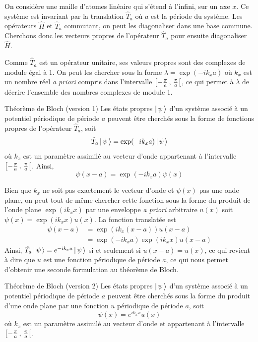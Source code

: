     On considère une maille d’atomes linéaire qui s’étend à l’infini, sur un axe $x$. Ce système est invariant par la translation $\hat{T}_{a}$ où $a$ est la période du système. Les opérateurs $\hat{H}$ et $\hat{T}_a$ commutant, on peut les diagonaliser dans une base commune. Cherchons donc les vecteurs propres de l’opérateur $\hat{T}_a$ pour ensuite diagonaliser $\hat{H}$. 

    Comme $\hat{T}_a$ est un opérateur unitaire, ses valeurs propres sont des complexes de module égal à 1. On peut les chercher sous la forme $\lambda = \exp(-ik_xa)$ où $k_x$ est un nombre réel \textit{a priori} compris dans l’intervalle $\left[ -\frac{\pi}{a} \, , \, \frac{\pi}{a} \right[$, ce qui permet à $\lambda$ de décrire l’ensemble des nombres complexes de module 1.

    \begin{omed}{Théorème de Bloch (version 1)}
        Les états propres $\left| \, \psi \, \right>$ d’un système associé à un potentiel périodique de période $a$ peuvent être cherchés sous la forme de fonctions propres de l’opérateur $\hat{T}_a$, soit 
        \[ \hat{T}_a \left| \, \psi \, \right> = \exp(-i k_x a) \left| \, \psi \, \right> \] 
        où $k_x$ est un paramètre assimilé au vecteur d’onde appartenant à l’intervalle $\left[ -\frac{\pi}{a} \, , \, \frac{\pi}{a} \right[$. Ainsi, 
        \[ \psi(x - a) = \exp(-i k_x a) \psi(x) \]   
    \end{omed}

    Bien que $k_x$ ne soit pas exactement le vecteur d’onde et $\psi(x)$ pas une onde plane, on peut tout de même chercher cette fonction sous la forme du produit de l’onde plane $\exp(i k_x x)$ par une enveloppe \textit{a priori} arbitraire $u(x)$ soit $\psi(x) = \exp(i k_x x) u(x)$. La fonction translatée est 
    \begin{align*}
        \psi(x-a)
        &= \exp(i k_x (x-a)) u(x-a) \\
        &= \exp(- i k_x a) \exp(i k_x x) u(x-a)
    \end{align*}
    Ainsi, $\hat{T}_a \left| \, \psi \, \right> = e^{-ik_xa} \left| \, \psi \, \right> $ si et seulement si $u(x-a) = u(x)$, ce qui revient à dire que $u$ est une fonction périodique de période $a$, ce qui nous permet d’obtenir une seconde formulation au théorème de Bloch.

    \begin{omed}{Théorème de Bloch (version 2)}
        Les états propres $\left| \, \psi \, \right>$ d’un système associé à un potentiel périodique de période $a$ peuvent être cherchés sous la forme du produit d’une onde plane par une fonction $u$ périodique de période $a$, soit
        \[ \psi(x) = e^{i k_x x} u(x) \]   
        où $k_x$ est un paramètre assimilé au vecteur d’onde et appartenant à l’intervalle $\left[ -\frac{\pi}{a} \, , \, \frac{\pi}{a} \right[$. 
    \end{omed}

